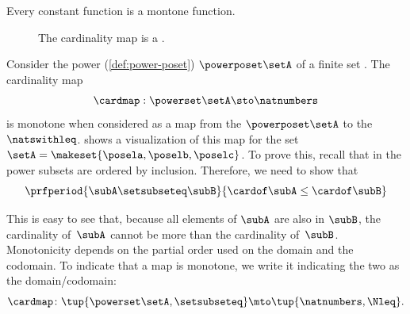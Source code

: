 \begin{example}
    Every constant function is a montone function.
\end{example}

\begin{figure}[b]
    \centering
    \caption{The cardinality map is a .}
    \label{fig:cardinality}
\end{figure}

\begin{example}\label{exa:cardinality}
    Consider the power  (\cref{def:power-poset}) $\powerposet\setA$ of a finite set \setA.
    The cardinality map
    \begin{equation}\label{eq:cardinality-map}
        \cardmap : \powerset\setA \sto \natnumbers
    \end{equation}
    is monotone when considered as a map from the  $\powerposet\setA$ to the  $\natswithleq$.
     shows a visualization of this map for the set~$\setA=\makeset{\posela,\poselb,\poselc}$.
    To prove this, recall that in the power  subsets are ordered by inclusion.
    Therefore, we need to show that
    \begin{equation}\label{eq:cardinality}
        \prfperiod{
            \subA \setsubseteq \subB
        }{
            \cardof \subA \leq \cardof \subB
        }
    \end{equation}

    This is easy to see that, because all elements of $\subA$ are also in $\subB$, the cardinality of~$\subA$ cannot be more than the cardinality of~$\subB$.
    Monotonicity depends on the partial order used on the domain and the codomain.
    To indicate that a map is monotone, we write it indicating the two  as the domain/codomain:
    \begin{equation}\label{eq:cardinality-as-posmap}
        \cardmap \colon \tup{\powerset\setA, \setsubseteq} \mto \tup{\natnumbers, {{\Nleq}}}.
    \end{equation}
\end{example}

